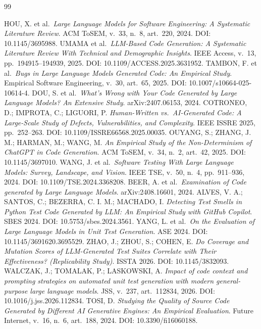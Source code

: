 \documentclass[sigconf,anonymous]{acmart}
\begin{document}
\begin{thebibliography}{99}
\scriptsize

 HOU, X. et al.\ \emph{Large Language Models for Software Engineering: A Systematic Literature Review}. ACM ToSEM, v.~33, n.~8, art.~220, 2024. DOI: 10.1145/3695988.
 UMAMA et al.\ \emph{LLM-Based Code Generation: A Systematic Literature Review With Technical and Demographic Insights}. IEEE Access, v.~13, pp.~194915--194939, 2025. DOI: 10.1109/ACCESS.2025.3631952.
 TAMBON, F. et al.\ \emph{Bugs in Large Language Models Generated Code: An Empirical Study}. Empirical Software Engineering, v.~30, art.~65, 2025. DOI: 10.1007/s10664-025-10614-4.
 DOU, S. et al.\ \emph{What's Wrong with Your Code Generated by Large Language Models? An Extensive Study}. arXiv:2407.06153, 2024.
 COTRONEO, D.; IMPROTA, C.; LIGUORI, P. \emph{Human-Written vs.\ AI-Generated Code: A Large-Scale Study of Defects, Vulnerabilities, and Complexity}. IEEE ISSRE 2025, pp.~252--263. DOI: 10.1109/ISSRE66568.2025.00035.
 OUYANG, S.; ZHANG, J. M.; HARMAN, M.; WANG, M. \emph{An Empirical Study of the Non-Determinism of ChatGPT in Code Generation}. ACM ToSEM, v.~34, n.~2, art.~42, 2025. DOI: 10.1145/3697010.
 WANG, J. et al.\ \emph{Software Testing With Large Language Models: Survey, Landscape, and Vision}. IEEE TSE, v.~50, n.~4, pp.~911--936, 2024. DOI: 10.1109/TSE.2024.3368208.
 BEER, A. et al.\ \emph{Examination of Code generated by Large Language Models}. arXiv:2408.16601, 2024.
 ALVES, V. A.; SANTOS, C.; BEZERRA, C. I. M.; MACHADO, I. \emph{Detecting Test Smells in Python Test Code Generated by LLM: An Empirical Study with GitHub Copilot}. SBES 2024. DOI: 10.5753/sbes.2024.3561.
 YANG, L. et al.\ \emph{On the Evaluation of Large Language Models in Unit Test Generation}. ASE 2024. DOI: 10.1145/3691620.3695529.
 ZHAO, J.; ZHOU, S.; COHEN, E. \emph{Do Coverage and Mutation Scores of LLM-Generated Test Suites Correlate with Their Effectiveness? (Replicability Study)}. ISSTA 2026. DOI: 10.1145/3832093.
 WALCZAK, J.; TOMALAK, P.; LASKOWSKI, A. \emph{Impact of code context and prompting strategies on automated unit test generation with modern general-purpose large language models}. JSS, v.~237, art.~112834, 2026. DOI: 10.1016/j.jss.2026.112834.
 TOSI, D. \emph{Studying the Quality of Source Code Generated by Different AI Generative Engines: An Empirical Evaluation}. Future Internet, v.~16, n.~6, art.~188, 2024. DOI: 10.3390/fi16060188.

\end{thebibliography}
\end{document}
